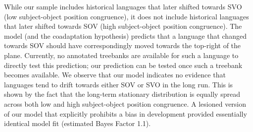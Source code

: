 \documentclass[9pt,twocolumn,twoside,lineno]{pnas-new}
\newcommand\comment[1]{{\color{red}#1}}
\newcommand\mhahn[1]{{\color{red}(#1)}}
\begin{document}


While our sample includes historical languages that later shifted towards SVO (low subject-object position congruence), it does not include historical languages that later shifted towards SOV (high subject-object position congruence).
The model (and the coadaptation hypothesis) predicts that a language that changed towards SOV should have correspondingly moved towards the top-right of the plane. 
Currently, no annotated treebanks are available for such a language to directly test this prediction; our prediction can be tested once such a treebank becomes available.
We observe that our model indicates no evidence that languages tend to drift towards either SOV or SVO in the long run.
This is shown by the fact that the long-term stationary distribution is equally spread across both low and high subject-object position congruence.
A lesioned version of our model that explicitly prohibits a bias in development provided essentially identical model fit (estimated Bayes Factor 1.1).
\end{document}
